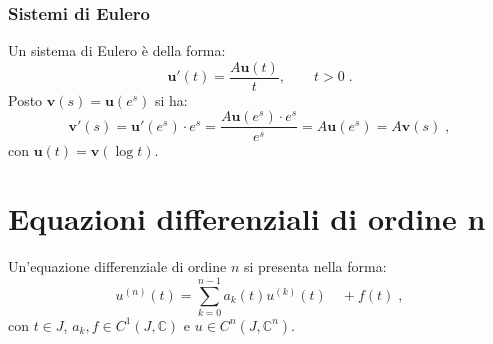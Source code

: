 \documentclass[a4paper,12pt]{report}
\theoremstyle{plain}
\theoremstyle{definition}
\theoremstyle{remark}
\numberwithin{equation}{section}
\begin{document}
\subsection{Sistemi di Eulero}
Un sistema di Eulero è della forma:
\begin{equation}
\mathbf{u}'(t)=\frac{A\mathbf{u}(t)}{t}, \qquad t>0\;.
\end{equation}
Posto $\mathbf{v}(s)=\mathbf{u}(e^s)$ si ha:
\begin{equation}
\mathbf{v}'(s)=\mathbf{u}'(e^s)\cdot e^s=\frac{A\mathbf{u}(e^s)\cdot e^s}{e^s}=A\mathbf{u}(e^s)=A\mathbf{v}(s)\;,
\end{equation}
con $\mathbf{u}(t)=\mathbf{v}(\log t)$.
\chapter{Equazioni differenziali di ordine n}
Un'equazione differenziale di ordine $n$ si presenta nella forma:
\begin{equation}
u^{(n)}(t)=\sum_{k=0}^{n-1} a_k(t)u^{(k)}(t) \quad+ f(t)\;,
\end{equation}
con $t \in J$, $a_k,f \in C^1(J,\mathbb{C})$ e $u \in C^n(J,\mathbb{C}^n)$.
\end{document}
